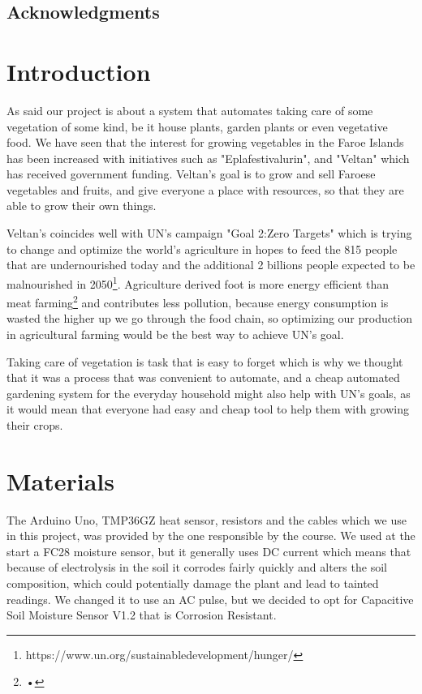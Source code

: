 \documentclass{article}
\begin{document}
\tableofcontents
\listoffigures
\listoftables
\pagebreak
{}
\begin{center}\section*{Acknowledgments}\end{center}

\pagebreak
{}
\section{Introduction}

As said our project is about a system that automates taking care of some vegetation of some kind, be it house plants, garden plants or even vegetative food. We have seen that the interest for growing vegetables in the Faroe Islands has been increased with initiatives such as "Eplafestivalurin", and "Veltan" which has received government funding. Veltan's goal is to grow and sell Faroese vegetables and fruits, and give everyone a place with resources, so that they are able to grow their own things.


Veltan's coincides well with UN's campaign "Goal 2:Zero Targets" which is trying to change and optimize the world's agriculture in hopes to feed the 815 people that are undernourished today and the additional 2 billions people expected to be malnourished in 2050\footnote{https://www.un.org/sustainabledevelopment/hunger/}. Agriculture derived foot is more energy efficient than meat farming\footnote{•} and contributes less pollution, because energy consumption is wasted the higher up we go through the food chain, so optimizing our production in agricultural farming would be the best way to achieve UN's goal.

Taking care of vegetation is task that is easy to forget which is why we thought that it was a process that was convenient to automate, and a cheap automated gardening system for the everyday household might also help with UN's goals, as it would mean that everyone had easy and cheap tool to help them with growing their crops.

\section{Materials}
The Arduino Uno, TMP36GZ heat sensor, resistors and the cables which we use in this project, was provided by the one responsible by the course. We used at the start a FC28 moisture sensor, but it generally uses DC current which means that because of electrolysis in the soil it corrodes fairly quickly and alters the soil composition, which could potentially damage the plant and lead to tainted readings. We changed it to use an AC pulse, but we decided to opt for Capacitive Soil Moisture Sensor V1.2 that is Corrosion Resistant.
\end{document}

